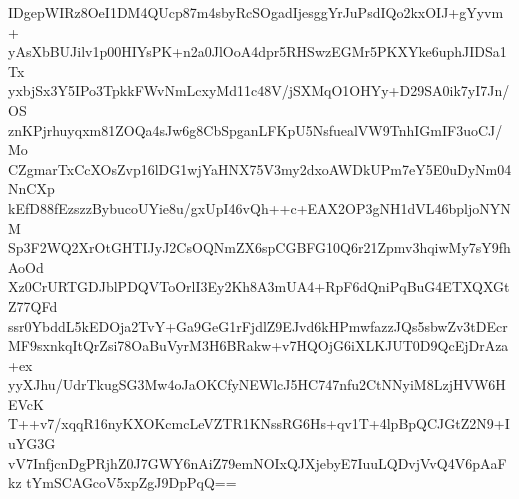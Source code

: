 IDgepWIRz8OeI1DM4QUcp87m4sbyRcSOgadIjesggYrJuPsdIQo2kxOIJ+gYyvm+
yAsXbBUJilv1p00HIYsPK+n2a0JlOoA4dpr5RHSwzEGMr5PKXYke6uphJIDSa1Tx
yxbjSx3Y5IPo3TpkkFWvNmLcxyMd11c48V/jSXMqO1OHYy+D29SA0ik7yI7Jn/OS
znKPjrhuyqxm81ZOQa4sJw6g8CbSpganLFKpU5NsfuealVW9TnhIGmIF3uoCJ/Mo
CZgmarTxCcXOsZvp16lDG1wjYaHNX75V3my2dxoAWDkUPm7eY5E0uDyNm04NnCXp
kEfD88fEzszzBybucoUYie8u/gxUpI46vQh++c+EAX2OP3gNH1dVL46bpljoNYNM
Sp3F2WQ2XrOtGHTIJyJ2CsOQNmZX6spCGBFG10Q6r21Zpmv3hqiwMy7sY9fhAoOd
Xz0CrURTGDJblPDQVToOrlI3Ey2Kh8A3mUA4+RpF6dQniPqBuG4ETXQXGtZ77QFd
ssr0YbddL5kEDOja2TvY+Ga9GeG1rFjdlZ9EJvd6kHPmwfazzJQs5sbwZv3tDEcr
MF9sxnkqItQrZsi78OaBuVyrM3H6BRakw+v7HQOjG6iXLKJUT0D9QcEjDrAza+ex
yyXJhu/UdrTkugSG3Mw4oJaOKCfyNEWlcJ5HC747nfu2CtNNyiM8LzjHVW6HEVcK
T++v7/xqqR16nyKXOKcmcLeVZTR1KNssRG6Hs+qv1T+4lpBpQCJGtZ2N9+IuYG3G
vV7InfjcnDgPRjhZ0J7GWY6nAiZ79emNOIxQJXjebyE7IuuLQDvjVvQ4V6pAaFkz
tYmSCAGcoV5xpZgJ9DpPqQ==
